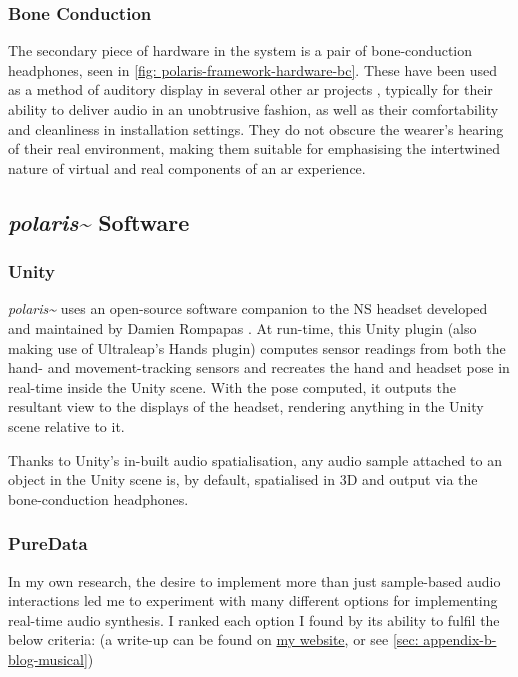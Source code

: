 \subsubsection{Bone Conduction}\label{sec: polaris-framework-hardware-bc}
The secondary piece of hardware in the system is a pair of bone-conduction headphones, seen in \autoref{fig: polaris-framework-hardware-bc}. These have been used as a method of auditory display in several other \gls{ar} projects \citep{lindeman2008,barde2016,chevalier2018}, typically for their ability to deliver audio in an unobtrusive fashion, as well as their comfortability and cleanliness in installation settings. They do not obscure the wearer's hearing of their real environment, making them suitable for emphasising the intertwined nature of virtual and real components of an \gls{ar} experience.


\subsection{\textit{polaris\textasciitilde{}} Software}\label{sec: polaris-framework-software}
\subsubsection{Unity}\label{sec: polaris-framework-software-unity}
\textit{polaris\textasciitilde{}} uses an open-source software companion to the NS headset developed and maintained by Damien Rompapas \citeyearpar{rompapas2020}. At run-time, this Unity plugin (also making use of Ultraleap's Hands plugin) computes sensor readings from both the hand- and movement-tracking sensors and recreates the hand and headset pose in real-time inside the Unity scene. With the pose computed, it outputs the resultant view to the displays of the headset, rendering anything in the Unity scene relative to it.

Thanks to Unity's in-built audio spatialisation, any audio sample attached to an object in the Unity scene is, by default, spatialised in 3D and output via the bone-conduction headphones.

\subsubsection{PureData}\label{sec: polaris-framework-software-puredata}
In my own research, the desire to implement more than just sample-based audio interactions led me to experiment with many different options for implementing real-time audio synthesis. I ranked each option I found by its ability to fulfil the below criteria: (a write-up can be found on \href{https://sambilbow.github.io/projects/polaris/software.html}{my website}, or see \autoref{sec: appendix-b-blog-musical})

